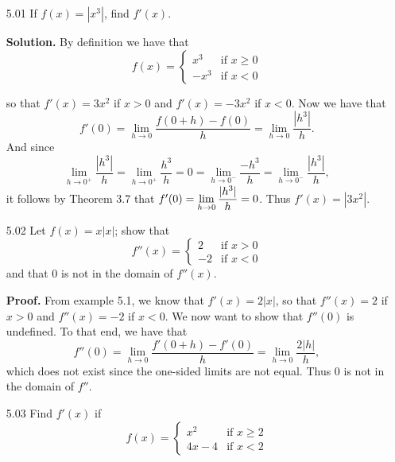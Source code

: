 \begin{enumerate}
   \item[5.01] If $f(x) = |x^3|$, find $f'(x)$.

      \textbf{Solution.} By definition we have that
      \begin{equation*}
         f(x) = \left\{\begin{array}{rl}
            x^3 & \text{if } x \ge 0 \\
            -x^3 & \text{if } x < 0
         \end{array} \right. 
      \end{equation*}
      
      so that $f'(x) = 3x^2$ if $x > 0$ and $f'(x) = -3x^2$ if $x < 0$. Now we 
      have that
      $$f'(0) = \lim_{h \to 0}\frac{f(0 + h) - f(0)}{h} =
        \lim_{h \to 0}\frac{|h^3|}{h}.
      $$
      And since
      $$\lim_{h \to 0^+}\frac{|h^3|}{h} = \lim_{h \to 0^+}\frac{h^3}{h} = 0 =
        \lim_{h \to 0^-}\frac{-h^3}{h} = \lim_{h \to 0^-}\frac{|h^3|}{h},$$
      it follows by Theorem 3.7 that
      $f'(0) = \displaystyle\lim_{h \to 0}\frac{|h^3|}{h} = 0$. Thus $f'(x) = |3x^2|$.
   \item[5.02] Let $f(x) = x|x|$; show that
               \begin{equation*}
                  f''(x) = \left\{\begin{array}{rl}
                     2 & \text{if } x > 0 \\
                     -2 & \text{if } x < 0
                  \end{array} \right. 
               \end{equation*}
               and that 0 is not in the domain of $f''(x)$.
               
      \textbf{Proof.} From example 5.1, we know that  $f'(x) = 2|x|$, so that
      $f''(x) = 2$ if $x > 0$ and $f''(x) = -2$ if $x < 0$. We now want to show
      that $f''(0)$ is undefined. To that end, we have that
      $$f''(0) = \lim_{h \to 0}\frac{f'(0 + h) - f'(0)}{h} = 
        \lim_{h \to 0}\frac{2|h|}{h},$$
      which does not exist since the one-sided limits are not equal. Thus 0 is
      not in the domain of $f''$.
   \item[5.03] Find $f'(x)$ if
               \begin{equation*}
                  f(x) = \left\{\begin{array}{ll}
                     x^2 & \text{if } x \ge 2 \\
                     4x - 4 & \text{if } x < 2
                  \end{array} \right. 
               \end{equation*}
               

\end{enumerate}
